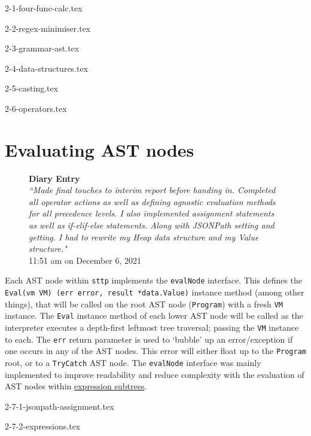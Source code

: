 \documentclass[]{full}
\theoremstyle{definition}
\begin{document}
{2-1-four-func-calc.tex}

{2-2-regex-minimiser.tex}

{2-3-grammar-ast.tex}

{2-4-data-structures.tex}

{2-5-casting.tex}

{2-6-operators.tex}

\section{Evaluating AST nodes}

\begin{figure}[H]
    \begin{center}
        \textbf{Diary Entry}\\[0.5em]
        \textit{``Made final touches to interim report before handing in. Completed all operator actions as well as defining agnostic evaluation methods for all precedence levels. I also implemented assignment statements as well as if-elif-else statements. Along with JSONPath setting and getting. I had to rewrite my Heap data structure and my Value structure."}\\[0.5em]
        \tiny{11:51 am on December 6, 2021}
    \end{center}
\end{figure}
    
Each AST node within \verb|sttp| implements the \verb|evalNode| interface. This defines the \texttt{Eval(vm VM) (err error, result *data.Value)} instance method (among other things), that will be called on the root AST node (\verb|Program|) with a fresh \verb|VM| instance. The \verb|Eval| instance method of each lower AST node will be called as the interpreter executes a depth-first leftmost tree traversal; passing the \verb|VM| instance to each. The \verb|err| return parameter is used to `bubble' up an error/exception if one occurs in any of the AST nodes. This error will either float up to the \verb|Program| root, or to a \verb|TryCatch| AST node. The \verb|evalNode| interface was mainly implemented to improve readability and reduce complexity with the evaluation of AST nodes within \hyperref[sec:development-ast-nodes-expressions]{expression subtrees}.

{2-7-1-jsonpath-assignment.tex}

{2-7-2-expressions.tex}
\end{document}
